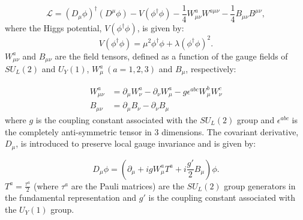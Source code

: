 \begin{equation}
\mathcal{L}=(D_{\mu}\phi)^{\dagger}(D^{\mu}\phi)-V(\phi^{\dagger} \phi)-\frac{1}{4} W_{\mu \nu}^a W^{a \mu \nu}-\frac{1}{4} B_{\mu \nu} B^{\mu \nu},
\label{eq:Lagragian}
\end{equation}
where the Higgs potential, $V(\phi^{\dagger} \phi)$, is given by:
\begin{equation}
V(\phi^{\dagger} \phi) = \mu^2 \phi^{\dagger} \phi + \lambda (\phi^{\dagger} \phi)^2.
\label{eq:higgsV}
\end{equation}
$W^a_{\mu\nu}$ and $B_{\mu\nu}$ are the field tensors, defined as a function of the gauge fields of $SU_L(2)$ and $U_Y(1)$, $W^a_{\mu}~(a=1,2,3)$ and $B_{\mu}$,  respectively:

\begin{align}
	W^a_{\mu\nu}&=\partial_{\mu}W^a_{\nu}-\partial_{\nu}W^a_{\mu}-g\epsilon^{abc}W^b_{\mu}W^c_{\nu} \\
	B_{\mu\nu}&=\partial_{\mu}B_{\nu}-\partial_{\nu}B_{\mu}
\end{align}
where $g$ is the coupling constant associated with the $SU_L(2)$ group and $\epsilon^{abc}$ is the completely anti-symmetric tensor in 3 dimensions. The covariant derivative, $D_{\mu}$, is introduced to preserve local gauge invariance and is given by:

\begin{equation}
	D_{\mu}\phi = \left(\partial_{\mu} + igW^a_{\mu}T^a + i\frac{g'}{2}B_{\mu}\right)\phi.
	\label{eq:covariant_derivative}
\end{equation}
$T^a=\frac{\tau^a}{2}$ (where $\tau^a$ are the Pauli matrices) are the $SU_L(2)$ group generators in the fundamental representation and $g'$ is the coupling constant associated with the $U_Y(1)$ group.

